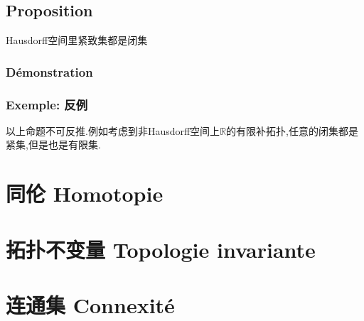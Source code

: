 \documentclass[12pt, a4paper, oneside]{ctexbook}
\newcommand{\R }{\mathbb{R}}%
\begin{document}
  \subsection{Proposition}
  Hausdorff空间里紧致集都是闭集
  \subsubsection{Démonstration}


  \subsubsection{Exemple: 反例}
  以上命题不可反推.例如考虑到非Hausdorff空间上$\R$的有限补拓扑,任意的闭集都是紧集,但是也是有限集.

  \section{同伦 Homotopie}
  \section{拓扑不变量 Topologie invariante}
  \section{连通集 Connexité}







\ifx\allfiles\undefined
\end{document}
